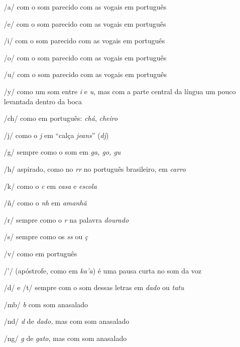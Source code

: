 \begin{itemize}
\item[/a/] com o som parecido com as vogais em português
\item[/e/] com o som parecido com as vogais em português
\item[/i/] com o som parecido com as vogais em português
\item[/o/] com o som parecido com as vogais em português
\item[/u/] com o som parecido com as vogais em português

\item[/y/] como um som entre \emph{i} e \emph{u}, mas com a parte central da
língua um pouco levantada dentro da boca

\item[/ch/] como em português: \emph{chá}, \emph{cheiro}

\item[/j/] como o \emph{j} em ``calça \emph{jeans}'' (\emph{dj})

\item[/g/] sempre como o som em \emph{ga, go, gu }

\item[/h/] aspirado, como no \emph{rr} no português brasileiro, em \emph{carro}

\item[/k/] como o \emph{c} em \emph{casa} e \emph{escola}

\item[/ñ/] como o \emph{nh} em \emph{amanhã}

\item[/r/] sempre como o \emph{r} na palavra \emph{dourado}

\item[/s/] sempre como os \emph{ss} ou \emph{ç}

\item[/v/] como em português

\item[/'/] (apóstrofe, como em \emph{ka'a}) é uma pausa curta no som da voz

\item[/d/] e /t/ sempre com o som dessas letras em \emph{dado} ou \emph{tatu}

\item[/mb/] \emph{b} com som anasalado

\item[/nd/] \emph{d} de \emph{dado,} mas com som anasalado

\item[/ng/] \emph{g} de \emph{gato}, mas com som anasalado
\end{itemize}

